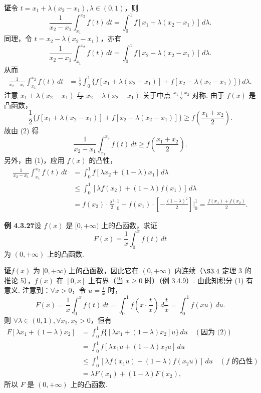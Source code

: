 \documentclass[UTF8, 12pt, fontset=fandol, oneside]{ctexart}
\begin{document}
\noindent\textbf{证}\quad 令 $t=x_1+\lambda(x_2-x_1),\lambda\in(0,1)$，则
\[
\frac1{x_2-x_1}\int_{x_1}^{x_2}f(t)\,dt
=\int_0^1 f[x_1+\lambda(x_2-x_1)]\,d\lambda.
\tag{1}
\]
同理，令 $t=x_2-\lambda(x_2-x_1)$，亦有
\[
\frac1{x_2-x_1}\int_{x_1}^{x_2}f(t)\,dt
=\int_0^1 f[x_2-\lambda(x_2-x_1)]\,d\lambda.
\]
从而
\[
\begin{aligned}
\frac1{x_2-x_1}\int_{x_1}^{x_2}f(t)\,dt
&=\frac12\int_0^1\{f[x_1+\lambda(x_2-x_1)]
+f[x_2-\lambda(x_2-x_1)]\}\,d\lambda.
\end{aligned}
\tag{2}
\]
注意 $x_1+\lambda(x_2-x_1)$ 与 $x_2-\lambda(x_2-x_1)$ 关于中点 $\frac{x_1+x_2}{2}$ 对称. 由于 $f(x)$ 是凸函数，
\[
\frac12\{f[x_1+\lambda(x_2-x_1)]
+f[x_2-\lambda(x_2-x_1)]\}
\ge f\left(\frac{x_1+x_2}{2}\right).
\]
故由 (2) 得
\[
\frac1{x_2-x_1}\int_{x_1}^{x_2}f(t)\,dt
\ge f\left(\frac{x_1+x_2}{2}\right).
\]
另外，由 (1)，应用 $f(x)$ 的凸性，
\[
\begin{aligned}
\frac1{x_2-x_1}\int_{x_1}^{x_2}f(t)\,dt
&=\int_0^1 f[\lambda x_2+(1-\lambda)x_1]\,d\lambda\\
&\le\int_0^1[\lambda f(x_2)+(1-\lambda)f(x_1)]\,d\lambda\\
&=f(x_2)\cdot\frac{\lambda^2}{2}\bigg|_0^1
+f(x_1)\cdot\left[-\frac{(1-\lambda)^2}{2}\right]\bigg|_0^1
=\frac{f(x_1)+f(x_2)}2.
\end{aligned}
\]

\noindent\textbf{例 4.3.27}\quad 设 $f(x)$ 是 $[0,+\infty)$ 上的凸函数，求证
\[
F(x)=\frac1x\int_0^x f(t)\,dt
\tag{1}
\]
为 $(0,+\infty)$ 上的凸函数.

\noindent\textbf{证}\quad $f(x)$ 为 $[0,+\infty)$ 上的凸函数，因此它在 $(0,+\infty)$ 内连续（$\S3.4$ 定理 3 的推论 5），$f(x)$ 在 $[0,x]$ 上有界（当 $x\ge0$ 时）（例 3.4.9）. 由此知积分 (1) 有意义. 注意到：$\forall x>0$，令 $u=\frac{t}{x}$ 时，
\[
F(x)=\frac1x\int_0^x f(t)\,dt
=\int_0^1 f\left(x\cdot\frac{t}{x}\right)\,d\frac{t}{x}
=\int_0^1 f(xu)\,du.
\tag{2}
\]
则 $\forall\lambda\in(0,1),\forall x_1,x_2>0$，恒有
\[
\begin{aligned}
F[\lambda x_1+(1-\lambda)x_2]
&=\int_0^1 f\{[\lambda x_1+(1-\lambda)x_2]u\}\,du\quad(\text{因为 (2)})\\
&=\int_0^1 f[\lambda x_1u+(1-\lambda)x_2u]\,du\\
&\le\int_0^1[\lambda f(x_1u)+(1-\lambda)f(x_2u)]\,du\quad(f\text{ 的凸性})\\
&=\lambda F(x_1)+(1-\lambda)F(x_2),
\end{aligned}
\]
所以 $F$ 是 $(0,+\infty)$ 上的凸函数.
\end{document}
